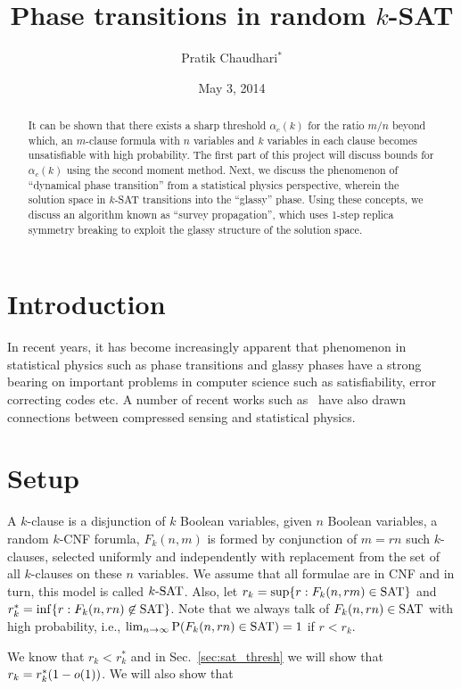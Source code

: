 \documentclass[letterpaper, 10pt, twocolumn, reqno]{amsart}
\title{Phase transitions in random $k$-SAT}
\author{Pratik Chaudhari$^*$}
\date{May 3, 2014}
\begin{document}
\begin{abstract}
It can be shown that there exists a sharp threshold $\alpha_c(k)$ for the ratio $m/n$ beyond which, an $m$-clause formula with $n$ variables and $k$ variables in each clause becomes unsatisfiable with high probability. The first part of this project will discuss bounds for $\alpha_c(k)$ using the second moment method.
%
Next, we discuss the phenomenon of ``dynamical phase transition'' from a statistical physics perspective, wherein the solution space in $k$-SAT transitions into the ``glassy'' phase. Using these concepts, we discuss an algorithm known as ``survey propagation'', which uses 1-step replica symmetry breaking to exploit the glassy structure of the solution space.
\end{abstract}
\maketitle

\section{Introduction}
In recent years, it has become increasingly apparent that phenomenon in statistical physics such as phase transitions and glassy phases have a strong bearing on important problems in computer science such as satisfiability, error correcting codes etc. A number of recent works such as~\cite{krzakala2012statistical} have also drawn connections between compressed sensing and statistical physics.


\section{Setup}
\label{sec:setup}
A $k$-clause is a disjunction of $k$ Boolean variables, given $n$ Boolean
variables, a random $k$-CNF forumla, $F_k(n, m)$ is formed by conjunction of $m = rn$ such $k$-clauses, selected uniformly and independently with
replacement from the set of all $k$-clauses on these $n$ variables. We assume that all formulae are in CNF and in turn, this model is called $k\textrm{-SAT}$. Also,
let $r_k = \sup \{ r: F_k(n, rm) \in \textrm{SAT} \}$ and $r_k^* = \inf \{ r: F_k(n, rn) \not\in \textrm{SAT} \}$. Note that we always talk of $F_k(n,rn) \in \textrm{SAT}$ with high probability, i.e., $\lim_{n\to \infty} \textrm{P}(F_k(n,rn) \in \textrm{SAT}) = 1$ if $r < r_k$.

We know that $r_k < r_k^*$ and in Sec.~\ref{sec:sat_thresh}
 we will show that $r_k = r_k^*(1-o(1))$. We will also show that
\end{document}
